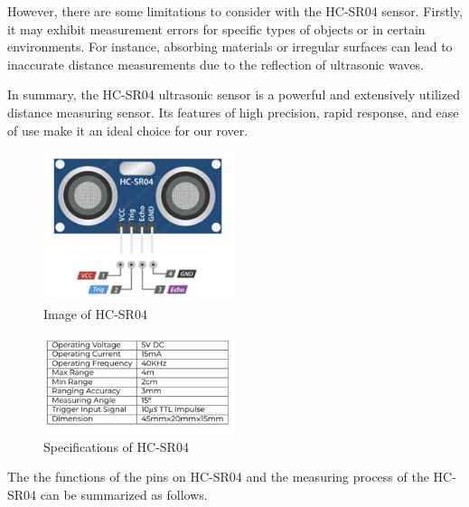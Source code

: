 \documentclass[12pt, a4paper, oneside]{report}
\begin{document}
However, there are some limitations to consider with the HC-SR04 sensor. Firstly, it may exhibit measurement errors for specific types of objects or in certain environments. For instance, absorbing materials or irregular surfaces can lead to inaccurate distance measurements due to the reflection of ultrasonic waves.

In summary, the HC-SR04 ultrasonic sensor is a powerful and extensively utilized distance measuring sensor. Its features of high precision, rapid response, and ease of use make it an ideal choice for our rover.
\begin{figure}[H]
  \centering
  \includegraphics[width=0.5\textwidth]{pic/HC-SR04/HC-SR04.png}
  \caption{Image of HC-SR04}
  \label{fig:HC-SR04}
\end{figure}
\begin{figure}[H]
  \centering
  \includegraphics[width=0.5\textwidth]{pic/HC-SR04/Specifications of HC-SR04.png}
  \caption{Specifications of HC-SR04}
  \label{fig:Specifications of HC-SR04}
\end{figure}

The the functions of the pins on HC-SR04 and the measuring process of the HC-SR04 can be summarized as follows.
\end{document}
